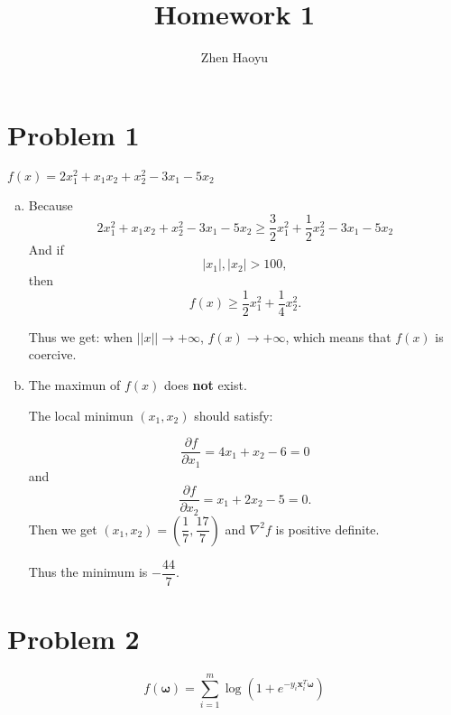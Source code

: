 \documentclass{article}
\def\bw{\boldsymbol{\omega}}
\def\bx{\boldsymbol{x}}
\begin{document}
\title{Homework 1}
\author{Zhen Haoyu}
\maketitle

\section*{Problem 1}

$f(x)=2x_1^2 +x_1x_2+x_2^2-3x_1-5x_2$

\begin{enumerate}[(a)]
	\item Because
		$$
		2x_1^2 +x_1x_2 + x_2^2-3x_1-5x_2
		\ge
		\frac{3}{2}x_1^2 + \frac{1}{2}x_2^2-3x_1-5x_2
		$$
		And if $$|x_1|, |x_2|>100,$$
		then $$f(x)\ge
		\frac{1}{2}x_1^2 + \frac{1}{4}x_2^2.$$

		Thus we get: when $\vert\vert x\vert\vert\rightarrow+\infty$, $f(x)\rightarrow+\infty$, which means that $f(x)$ is coercive.
	\item The maximun of $f(x)$ does \textbf{not} exist.
		
		The local minimun $(x_1,x_2)$ should satisfy:

		$$\frac{\partial f}{\partial x_1}=4x_1+x_2-6=0$$
		and 
		$$\frac{\partial f}{\partial x_2}=x_1+2x_2-5=0.$$
		Then we get $(x_1,x_2)=(\dfrac{1}{7},\dfrac{17}{7})$ and $\nabla^2 f$ is positive definite. 

		Thus the minimum is $-\dfrac{44}{7}$.
\end{enumerate}


\newpage
\section*{Problem 2}

$$ f(\bw)=\sum_{i=1}^m \log(1+e^{-y_i\bx_i^T\bw}) $$
\end{document}
